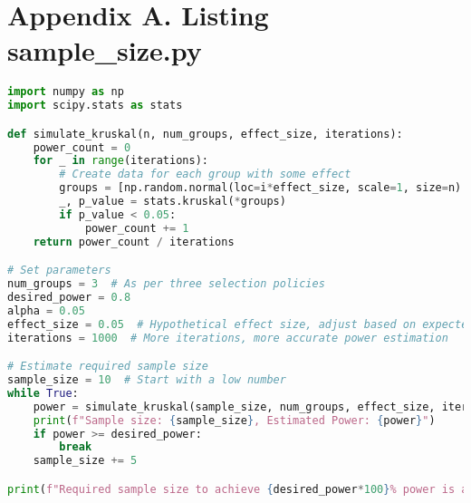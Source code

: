 \documentclass[12pt,a4paper]{article}
\begin{document}
\newpage

\section*{Appendix A. Listing sample\_size.py} %
\begin{lstlisting}[language=python, title=Showcase of implementation. sample\_size is 1940]
import numpy as np
import scipy.stats as stats

def simulate_kruskal(n, num_groups, effect_size, iterations):
    power_count = 0
    for _ in range(iterations):
        # Create data for each group with some effect
        groups = [np.random.normal(loc=i*effect_size, scale=1, size=n) for i in range(num_groups)]
        _, p_value = stats.kruskal(*groups)
        if p_value < 0.05:
            power_count += 1
    return power_count / iterations

# Set parameters
num_groups = 3  # As per three selection policies
desired_power = 0.8
alpha = 0.05
effect_size = 0.05  # Hypothetical effect size, adjust based on expected differences
iterations = 1000  # More iterations, more accurate power estimation

# Estimate required sample size
sample_size = 10  # Start with a low number
while True:
    power = simulate_kruskal(sample_size, num_groups, effect_size, iterations)
    print(f"Sample size: {sample_size}, Estimated Power: {power}")
    if power >= desired_power:
        break
    sample_size += 5

print(f"Required sample size to achieve {desired_power*100}% power is approximately {sample_size}")
\end{lstlisting}

\newpage
\end{document}
